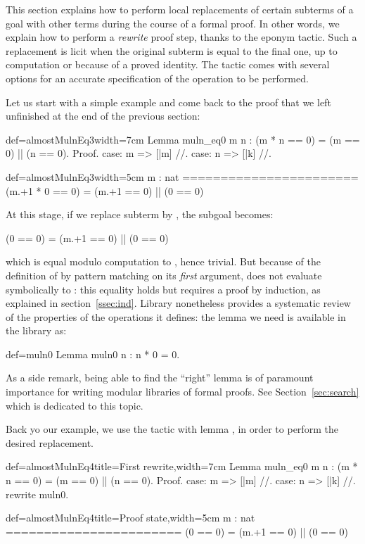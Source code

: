 This section explains how to perform local replacements of certain
subterms of a goal with other terms during the course of a formal
proof. In other words, we explain how to perform a
\emph{rewrite} proof step, thanks to the eponym  tactic.
Such a replacement is licit when the original subterm is equal
to the final one, up to computation or because of a proved
identity. The  tactic comes with several options for
an accurate specification of the operation to be performed.

Let us start with a simple example and come back to the proof that we
left unfinished at the end of the previous section:

\begin{coq}{def=almostMulnEq3}{width=7cm}
Lemma muln_eq0 m n :
  (m * n == 0) = (m == 0) || (n == 0).
Proof.
case: m => [|m] //.
case: n => [|k] //.
\end{coq}
\begin{coqout}{def=almostMulnEq3}{width=5cm}
m : nat
=======================
(m.+1 * 0 == 0) =
  (m.+1 == 0) || (0 == 0)
\end{coqout}
At this stage, if we replace subterm  by , the
subgoal becomes:

\begin{coqout}{}{}
(0 == 0) = (m.+1 == 0) || (0 == 0)
\end{coqout}
which is equal modulo computation to , hence trivial.
But because of
the definition of  by pattern matching on its \emph{first}
argument,  does not evaluate symbolically to : this
equality holds but requires a proof by induction, as explained in
section~\ref{ssec:ind}.
Library \mcbMC{} nonetheless provides a systematic review of the
properties of the operations it defines: the lemma we need is
available in the library as:

\begin{coq}{def=muln0}{}
Lemma muln0 n : n * 0 = 0.
\end{coq}

As a side remark, being able to find the ``right'' lemma is of
paramount importance for writing modular libraries of formal
proofs. See Section~\ref{sec:search} which is dedicated to this topic.

Back yo our example, we use the  tactic with lemma
, in order to perform the desired replacement.

\begin{coq}{def=almostMulnEq4}{title=First rewrite,width=7cm}
Lemma muln_eq0 m n :
  (m * n == 0) = (m == 0) || (n == 0).
Proof.
case: m => [|m] //.
case: n => [|k] //.
rewrite muln0.
\end{coq}
\begin{coqout}{def=almostMulnEq4}{title=Proof state,width=5cm}
m : nat
=======================
(0 == 0) =
  (m.+1 == 0) || (0 == 0)
\end{coqout}

